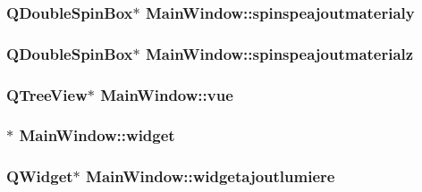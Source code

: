 \hypertarget{class_main_window_af5f3e81215640c685afbe36ea30926eb}{
\subsubsection[{spinspeajoutmaterialy}]{\setlength{\rightskip}{0pt plus 5cm}Q\+Double\+Spin\+Box$\ast$ Main\+Window\+::spinspeajoutmaterialy\hspace{0.3cm}{\ttfamily [private]}}}\label{class_main_window_af5f3e81215640c685afbe36ea30926eb}
\hypertarget{class_main_window_abfa1370458910b22754b3a2f9dcf8079}{
\subsubsection[{spinspeajoutmaterialz}]{\setlength{\rightskip}{0pt plus 5cm}Q\+Double\+Spin\+Box$\ast$ Main\+Window\+::spinspeajoutmaterialz\hspace{0.3cm}{\ttfamily [private]}}}\label{class_main_window_abfa1370458910b22754b3a2f9dcf8079}
\hypertarget{class_main_window_ac0150259862bd3b40a76b35a00b9e97a}{
\subsubsection[{vue}]{\setlength{\rightskip}{0pt plus 5cm}Q\+Tree\+View$\ast$ Main\+Window\+::vue\hspace{0.3cm}{\ttfamily [private]}}}\label{class_main_window_ac0150259862bd3b40a76b35a00b9e97a}
\hypertarget{class_main_window_a0a21ff789dee5a19a74d2461cf0820dc}{
\subsubsection[{widget}]{$\ast$ Main\+Window\+::widget\hspace{0.3cm}{\ttfamily [private]}}}\label{class_main_window_a0a21ff789dee5a19a74d2461cf0820dc}
\hypertarget{class_main_window_a9e2c8a96b09dbbfaa041531420603b9e}{
\subsubsection[{widgetajoutlumiere}]{\setlength{\rightskip}{0pt plus 5cm}Q\+Widget$\ast$ Main\+Window\+::widgetajoutlumiere\hspace{0.3cm}{\ttfamily [private]}}}\label{class_main_window_a9e2c8a96b09dbbfaa041531420603b9e}
